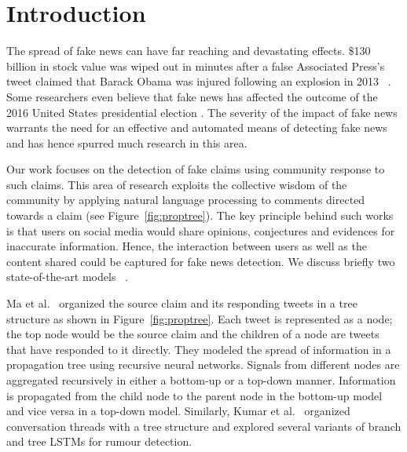 \documentclass[letterpaper]{article} %
\begin{document}
\maketitle

\section{Introduction}

The spread of fake news can have far reaching and devastating effects. \$130 billion in stock value was wiped out in minutes after a false Associated Press's tweet claimed that Barack Obama was injured following an explosion in 2013 ~\citep{rapoza_2017}. Some researchers even believe that fake news has affected the outcome of the 2016 United States presidential election \cite{gunther2018fake}. The severity of the impact of fake news warrants the need for an effective and automated means of detecting fake news and has hence spurred much research in this area.

Our work focuses on the detection of fake claims using community response to such claims. This area of research exploits the collective wisdom of the community by applying natural language processing to comments directed towards a claim (see Figure~\ref{fig:proptree}). The key principle behind such works is that users on social media would share opinions, conjectures and evidences for inaccurate information. Hence, the interaction between users as well as the content shared could be captured for fake news detection. We discuss briefly two state-of-the-art models ~\citep{ma18,kumar19}.

Ma et al.~ organized the source claim and its responding tweets in a tree structure as shown in Figure~\ref{fig:proptree}. Each tweet is represented as a node; the top node would be the source claim and the children of a node are tweets that have responded to it directly. They modeled the spread of information in a propagation tree using recursive neural networks. Signals from different nodes are aggregated recursively in either a bottom-up or a top-down manner. Information is propagated from the child node to the parent node in the bottom-up model and vice versa in a top-down model.
Similarly, Kumar et al.~ organized conversation threads with a tree structure and explored several variants of branch and tree LSTMs for rumour detection.
\end{document}
